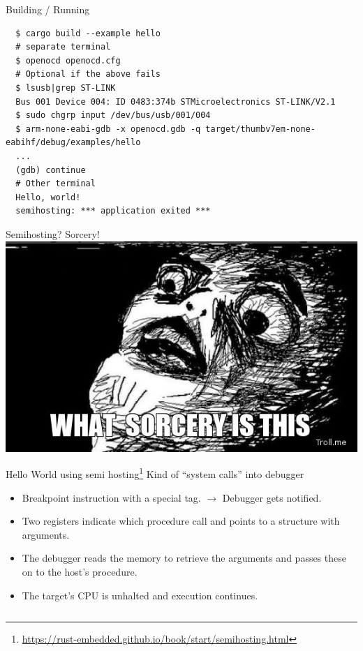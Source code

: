 \documentclass[aspectratio=1610,14pt,t]{beamer}
\begin{document}
\begin{frame}[c,fragile]{Building / Running}
  \begin{verbatim}
  $ cargo build --example hello
  # separate terminal
  $ openocd openocd.cfg
  # Optional if the above fails
  $ lsusb|grep ST-LINK
  Bus 001 Device 004: ID 0483:374b STMicroelectronics ST-LINK/V2.1
  $ sudo chgrp input /dev/bus/usb/001/004
  $ arm-none-eabi-gdb -x openocd.gdb -q target/thumbv7em-none-eabihf/debug/examples/hello
  ...
  (gdb) continue
  # Other terminal
  Hello, world!
  semihosting: *** application exited ***
  \end{verbatim}
\end{frame}

\begin{frame}[c]{Semihosting? Sorcery!}
  \centering
  \includegraphics[width=.7\textwidth]{img/what-sorcery-is-this.jpg}
\end{frame}

\begin{frame}[c,fragile]{Hello World using semi hosting\footnote{\url{https://rust-embedded.github.io/book/start/semihosting.html}}}
  Kind of ``system calls'' into debugger
  \begin{itemize}
    \item Breakpoint instruction with a special tag. $\rightarrow$ Debugger
      gets notified.
    \item Two registers indicate which procedure call and points to a structure
      with arguments.
    \item The debugger reads the memory to retrieve the arguments and passes
      these on to the host's procedure.
    \item The target's CPU is unhalted and execution continues.
  \end{itemize}
  \begin{verbatim}
  \end{verbatim}
\end{frame}
\end{document}
